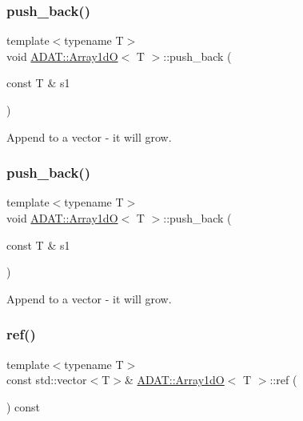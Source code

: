 \subsubsection{\texorpdfstring{push\_back()}{push\_back()}\hspace{0.1cm}{\footnotesize\ttfamily [2/3]}}
{\footnotesize\ttfamily template$<$typename T$>$ \\
void \mbox{\hyperlink{classADAT_1_1Array1dO}{A\+D\+A\+T\+::\+Array1dO}}$<$ T $>$\+::push\+\_\+back (\begin{DoxyParamCaption}\item[{const T \&}]{s1 }\end{DoxyParamCaption})\hspace{0.3cm}{\ttfamily [inline]}}



Append to a vector -\/ it will grow. 

\mbox{\label{classADAT_1_1Array1dO_a6e326e7686f842918f3cbda5c6a4b05f}} 
\subsubsection{\texorpdfstring{push\_back()}{push\_back()}\hspace{0.1cm}{\footnotesize\ttfamily [3/3]}}
{\footnotesize\ttfamily template$<$typename T$>$ \\
void \mbox{\hyperlink{classADAT_1_1Array1dO}{A\+D\+A\+T\+::\+Array1dO}}$<$ T $>$\+::push\+\_\+back (\begin{DoxyParamCaption}\item[{const T \&}]{s1 }\end{DoxyParamCaption})\hspace{0.3cm}{\ttfamily [inline]}}



Append to a vector -\/ it will grow. 

\mbox{\label{classADAT_1_1Array1dO_a3b74880db3b0d48e29fb28f80a283352}} 
\subsubsection{\texorpdfstring{ref()}{ref()}\hspace{0.1cm}{\footnotesize\ttfamily [1/6]}}
{\footnotesize\ttfamily template$<$typename T$>$ \\
const std\+::vector$<$T$>$\& \mbox{\hyperlink{classADAT_1_1Array1dO}{A\+D\+A\+T\+::\+Array1dO}}$<$ T $>$\+::ref (\begin{DoxyParamCaption}{ }\end{DoxyParamCaption}) const\hspace{0.3cm}{\ttfamily [inline]}}




